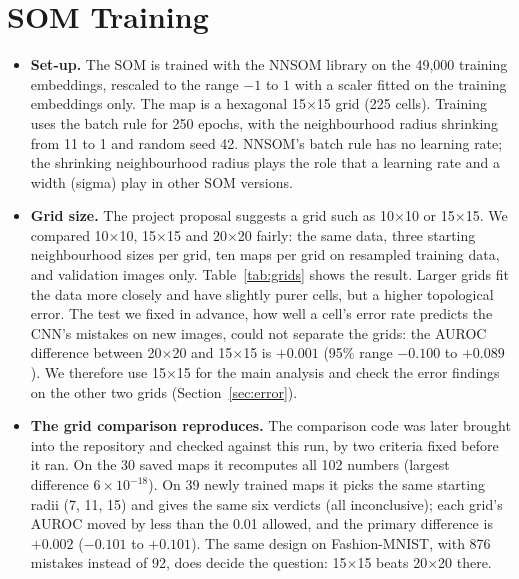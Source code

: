 \documentclass[11pt]{article}
\begin{document}
\section{SOM Training}\label{sec:training}

\begin{itemize}[leftmargin=1.4em, itemsep=2pt]
\item \textbf{Set-up.} The SOM is trained with the NNSOM library \cite{jafari_nnsom} on the 49,000 training embeddings, rescaled to the range $-1$ to $1$ with a scaler fitted on the training embeddings only. The map is a hexagonal 15$\times$15 grid (225 cells). Training uses the batch rule for 250 epochs, with the neighbourhood radius shrinking from 11 to 1 and random seed 42. NNSOM's batch rule has no learning rate; the shrinking neighbourhood radius plays the role that a learning rate and a width (sigma) play in other SOM versions.

\item \textbf{Grid size.} The project proposal suggests a grid such as 10$\times$10 or 15$\times$15. We compared 10$\times$10, 15$\times$15 and 20$\times$20 fairly: the same data, three starting neighbourhood sizes per grid, ten maps per grid on resampled training data, and validation images only. Table~\ref{tab:grids} shows the result. Larger grids fit the data more closely and have slightly purer cells, but a higher topological error. The test we fixed in advance, how well a cell's error rate predicts the CNN's mistakes on new images, could not separate the grids: the AUROC difference between 20$\times$20 and 15$\times$15 is $+0.001$ (95\% range $-0.100$ to $+0.089$). We therefore use 15$\times$15 for the main analysis and check the error findings on the other two grids (Section~\ref{sec:error}).

\item \textbf{The grid comparison reproduces.} The comparison code was later brought into the repository and checked against this run, by two criteria fixed before it ran. On the 30 saved maps it recomputes all 102 numbers (largest difference $6\times10^{-18}$). On 39 newly trained maps it picks the same starting radii (7, 11, 15) and gives the same six verdicts (all inconclusive); each grid's AUROC moved by less than the 0.01 allowed, and the primary difference is $+0.002$ ($-0.101$ to $+0.101$). The same design on Fashion-MNIST, with 876 mistakes instead of 92, does decide the question: 15$\times$15 beats 20$\times$20 there.


\end{itemize}
\end{document}
